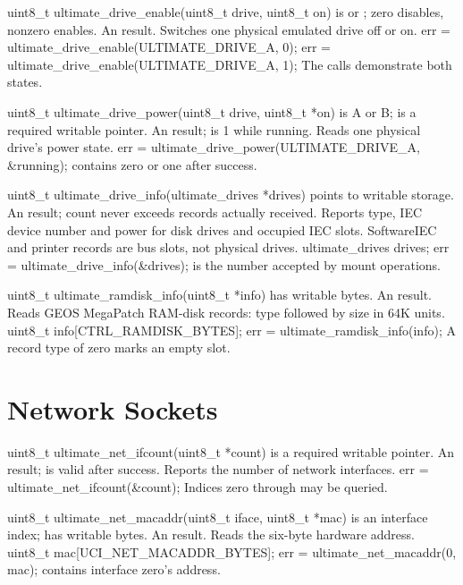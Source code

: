 \begin{referencechapter}
{uint8\_t ultimate\_drive\_enable(uint8\_t drive, uint8\_t on)}
{ is  or ; zero
 disables, nonzero enables.}
{An  result.}
{Switches one physical emulated drive off or on.}
{err = ultimate\_drive\_enable(ULTIMATE\_DRIVE\_A, 0); err = ultimate\_drive\_enable(ULTIMATE\_DRIVE\_A, 1);}
{The calls demonstrate both states.}

{uint8\_t ultimate\_drive\_power(uint8\_t drive, uint8\_t *on)}
{ is A or B;  is a required writable pointer.}
{An  result;  is 1 while running.}
{Reads one physical drive's power state.}
{err = ultimate\_drive\_power(ULTIMATE\_DRIVE\_A, \&running);}
{ contains zero or one after success.}

{uint8\_t ultimate\_drive\_info(ultimate\_drives *drives)}
{ points to writable
\hyperref[struct:ultimate-drives]{} storage.}
{An  result; count never exceeds records actually received.}
{Reports type, IEC device number and power for disk drives and occupied IEC
slots. SoftwareIEC and printer records are bus slots, not physical drives.}
{ultimate\_drives drives; err = ultimate\_drive\_info(\&drives);}
{ is the number accepted by mount operations.}

{uint8\_t ultimate\_ramdisk\_info(uint8\_t *info)}
{ has  writable bytes.}
{An  result.}
{Reads GEOS MegaPatch RAM-disk records: type followed by size in 64K units.}
{uint8\_t info[CTRL\_RAMDISK\_BYTES]; err = ultimate\_ramdisk\_info(info);}
{A record type of zero marks an empty slot.}

\section{Network Sockets}

{uint8\_t ultimate\_net\_ifcount(uint8\_t *count)}
{ is a required writable pointer.}
{An  result;  is valid after success.}
{Reports the number of network interfaces.}
{err = ultimate\_net\_ifcount(\&count);}
{Indices zero through  may be queried.}

{uint8\_t ultimate\_net\_macaddr(uint8\_t iface, uint8\_t *mac)}
{ is an interface index;  has
 writable bytes.}
{An  result.}
{Reads the six-byte hardware address.}
{uint8\_t mac[UCI\_NET\_MACADDR\_BYTES]; err = ultimate\_net\_macaddr(0, mac);}
{ contains interface zero's address.}


\end{referencechapter}
